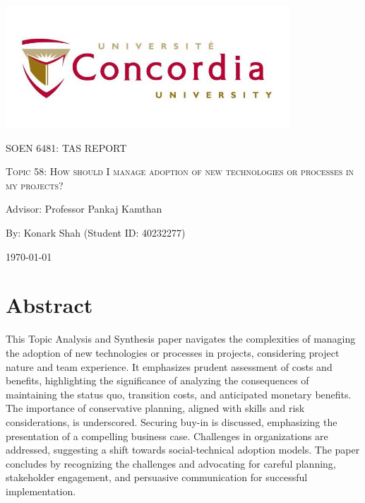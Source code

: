 \documentclass{article}
\begin{document}
\begin{titlepage}
    \centering
    \includegraphics[width=0.8\textwidth]{image.jpeg}\par %
     \vspace{2cm}
    {\scshape\Large SOEN 6481: TAS REPORT \par}
    \vspace{1.5cm}
    {\scshape\Huge Topic 58: How should I manage adoption of new technologies or processes in my projects?\par}
    \vspace{1.5cm}
    {\large Advisor: Professor Pankaj Kamthan\par}
    \vspace{1.5cm}
    {\large By: Konark Shah (Student ID: 40232277)\par}
    \vspace{1cm}
    {\large \today\par}
\end{titlepage}

\tableofcontents

\newpage

\section*{Abstract}
This Topic Analysis and Synthesis paper navigates the complexities of managing the adoption of new technologies or processes in projects, considering project nature and team experience. It emphasizes prudent assessment of costs and benefits, highlighting the significance of analyzing the consequences of maintaining the status quo, transition costs, and anticipated monetary benefits. The importance of conservative planning, aligned with skills and risk considerations, is underscored. Securing buy-in is discussed, emphasizing the presentation of a compelling business case. Challenges in organizations are addressed, suggesting a shift towards social-technical adoption models. The paper concludes by recognizing the challenges and advocating for careful planning, stakeholder engagement, and persuasive communication for successful implementation.
\end{document}
